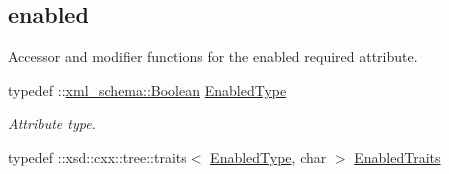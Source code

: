 \subsection*{enabled}
\label{_amgrpa10311459433adf322f2590a4987c423}
Accessor and modifier functions for the enabled required attribute. \begin{DoxyCompactItemize}
\item 
\hypertarget{classopenstack_1_1xml_1_1BackupSchedule_a4a4b5000949fa636b9d7fc6f4ca4250b}{
typedef ::\hyperlink{namespacexml__schema_a2749f4f861e3517d559bb221b03e6b5b}{xml\_\-schema::Boolean} \hyperlink{classopenstack_1_1xml_1_1BackupSchedule_a4a4b5000949fa636b9d7fc6f4ca4250b}{EnabledType}}
\label{classopenstack_1_1xml_1_1BackupSchedule_a4a4b5000949fa636b9d7fc6f4ca4250b}

\begin{DoxyCompactList}\small\item\em Attribute type. \item\end{DoxyCompactList}\item 
\hypertarget{classopenstack_1_1xml_1_1BackupSchedule_a13f86e1e6fb636e718f83cc2082c6e03}{
typedef ::xsd::cxx::tree::traits$<$ \hyperlink{classopenstack_1_1xml_1_1BackupSchedule_a4a4b5000949fa636b9d7fc6f4ca4250b}{EnabledType}, char $>$ \hyperlink{classopenstack_1_1xml_1_1BackupSchedule_a13f86e1e6fb636e718f83cc2082c6e03}{EnabledTraits}}
\label{classopenstack_1_1xml_1_1BackupSchedule_a13f86e1e6fb636e718f83cc2082c6e03}


\end{DoxyCompactItemize}
